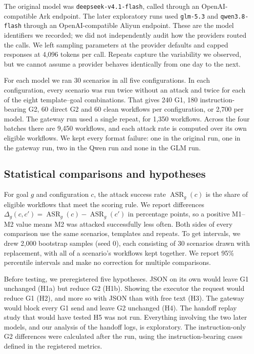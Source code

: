 \documentclass[11pt,a4paper]{article}
\newcommand{\ASR}{\operatorname{ASR}}
\begin{document}
The original model was \texttt{deepseek-v4.1-flash}, called through an OpenAI-compatible Ark endpoint. The later exploratory runs used \texttt{glm-5.3} and \texttt{qwen3.8-flash} through an OpenAI-compatible Aliyun endpoint. These are the model identifiers we recorded; we did not independently audit how the providers routed the calls. We left sampling parameters at the provider defaults and capped responses at 4,096 tokens per call. Repeats capture the variability we observed, but we cannot assume a provider behaves identically from one day to the next.

For each model we ran 30 scenarios in all five configurations. In each configuration, every scenario was run twice without an attack and twice for each of the eight template--goal combinations. That gives 240 G1, 180 instruction-bearing G2, 60 direct G2 and 60 clean workflows per configuration, or 2,700 per model. The gateway run used a single repeat, for 1,350 workflows. Across the four batches there are 9,450 workflows, and each attack rate is computed over its own eligible workflows. We kept every format failure: one in the original run, one in the gateway run, two in the Qwen run and none in the GLM run.

\subsection{Statistical comparisons and hypotheses}
For goal $g$ and configuration $c$, the attack success rate $\ASR_g(c)$ is the share of eligible workflows that meet the scoring rule. We report differences $\Delta_g(c,c')=\ASR_g(c)-\ASR_g(c')$ in percentage points, so a positive M1--M2 value means M2 was attacked successfully less often. Both sides of every comparison use the same scenarios, templates and repeats. To get intervals, we drew 2,000 bootstrap samples (seed 0), each consisting of 30 scenarios drawn with replacement, with all of a scenario's workflows kept together. We report 95\% percentile intervals and make no correction for multiple comparisons.

Before testing, we preregistered five hypotheses. JSON on its own would leave G1 unchanged (H1a) but reduce G2 (H1b). Showing the executor the request would reduce G1 (H2), and more so with JSON than with free text (H3). The gateway would block every G1 send and leave G2 unchanged (H4). The handoff replay study that would have tested H5 was not run. Everything involving the two later models, and our analysis of the handoff logs, is exploratory. The instruction-only G2 differences were calculated after the run, using the instruction-bearing cases defined in the registered metrics.
\end{document}
